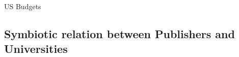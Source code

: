 \documentclass[10pt,compress,serif,aspectratio=169]{beamer}
\begin{document}
\begin{frame}[t]{US Budgets}
\end{frame}


  \subsection{Symbiotic relation between Publishers and Universities}
\end{document}
